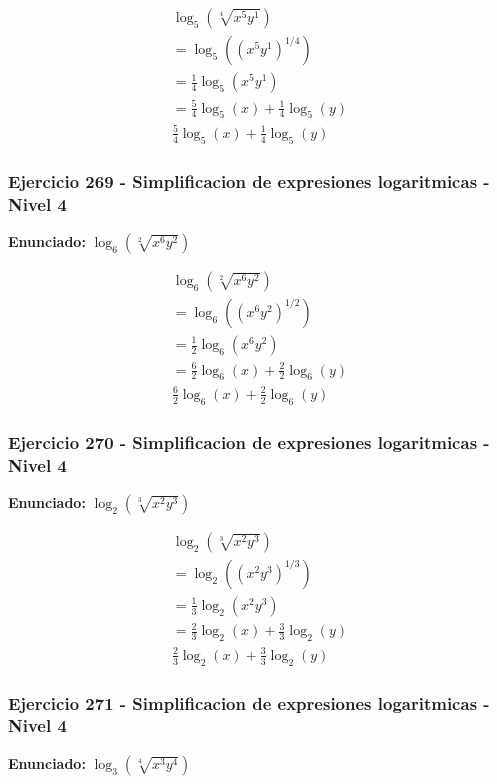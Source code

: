 \documentclass[12pt,a4paper]{article}
\begin{document}
\[
\begin{aligned}
\log_{5}\left(\sqrt[4]{x^{5}y^{1}}\right)\\
=\log_{5}\left((x^{5}y^{1})^{1/4}\right)\\
=\frac{1}{4}\log_{5}\left(x^{5}y^{1}\right) \\
=\frac{5}{4}\log_{5}\left(x\right)+\frac{1}{4}\log_{5}\left(y\right)\\
\boxed{\frac{5}{4}\log_{5}\left(x\right)+\frac{1}{4}\log_{5}\left(y\right)}
\end{aligned}
\]


\subsubsection*{Ejercicio 269 - Simplificacion de expresiones logaritmicas - Nivel 4}
\textbf{Enunciado:} \(\log_{6}\left(\sqrt[2]{x^{6}y^{2}}\right)\)

\[
\begin{aligned}
\log_{6}\left(\sqrt[2]{x^{6}y^{2}}\right)\\
=\log_{6}\left((x^{6}y^{2})^{1/2}\right)\\
=\frac{1}{2}\log_{6}\left(x^{6}y^{2}\right) \\
=\frac{6}{2}\log_{6}\left(x\right)+\frac{2}{2}\log_{6}\left(y\right)\\
\boxed{\frac{6}{2}\log_{6}\left(x\right)+\frac{2}{2}\log_{6}\left(y\right)}
\end{aligned}
\]


\subsubsection*{Ejercicio 270 - Simplificacion de expresiones logaritmicas - Nivel 4}
\textbf{Enunciado:} \(\log_{2}\left(\sqrt[3]{x^{2}y^{3}}\right)\)

\[
\begin{aligned}
\log_{2}\left(\sqrt[3]{x^{2}y^{3}}\right)\\
=\log_{2}\left((x^{2}y^{3})^{1/3}\right)\\
=\frac{1}{3}\log_{2}\left(x^{2}y^{3}\right) \\
=\frac{2}{3}\log_{2}\left(x\right)+\frac{3}{3}\log_{2}\left(y\right)\\
\boxed{\frac{2}{3}\log_{2}\left(x\right)+\frac{3}{3}\log_{2}\left(y\right)}
\end{aligned}
\]


\subsubsection*{Ejercicio 271 - Simplificacion de expresiones logaritmicas - Nivel 4}
\textbf{Enunciado:} \(\log_{3}\left(\sqrt[4]{x^{3}y^{4}}\right)\)
\end{document}
